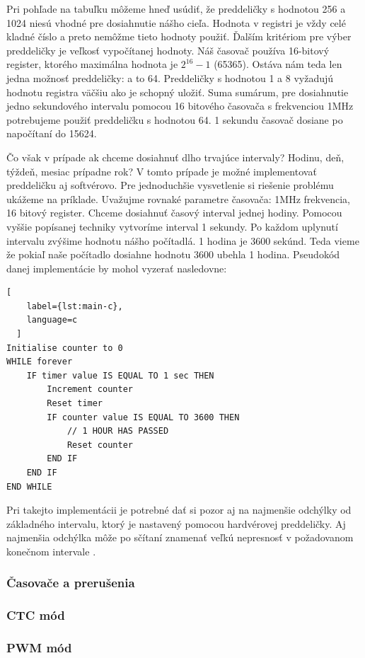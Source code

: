 Pri pohľade na tabuľku môžeme hneď usúdiť, že preddeličky s hodnotou 256 a 1024 niesú vhodné pre dosiahnutie nášho cieľa. Hodnota v registri je vždy celé kladné číslo a preto nemôžme tieto hodnoty použiť. Ďalším kritériom pre výber preddeličky je veľkosť
vypočítanej hodnoty. Náš časovač používa 16-bitový register, ktorého maximálna hodnota je $2^{16} -1$ (65365).
Ostáva nám teda len jedna možnosť preddeličky: a to 64. Preddeličky s hodnotou 1 a 8 vyžadujú hodnotu registra väčšiu ako je schopný uložiť. Suma sumárum, pre dosiahnutie jedno sekundového intervalu pomocou 16 bitového časovača s frekvenciou 1MHz potrebujeme použiť preddeličku s hodnotou 64. 1 sekundu časovač dosiane po napočítaní do 15624. \par
Čo však v prípade ak chceme dosiahnuť dlho trvajúce intervaly? Hodinu, deň, týždeň, mesiac prípadne rok?
V tomto prípade je možné implementovať preddeličku aj softvérovo. Pre jednoduchšie vysvetlenie si riešenie problému ukážeme na príklade. Uvažujme rovnaké parametre časovača: 1MHz frekvencia, 16 bitový register. Chceme dosiahnuť časový interval jednej hodiny. Pomocou vyššie popísanej techniky vytvoríme interval 1 sekundy.
Po každom uplynutí intervalu zvýšime hodnotu nášho počítadlá. 1 hodina je 3600 sekúnd. Teda vieme že pokiaľ naše počítadlo dosiahne hodnotu 3600 ubehla 1 hodina.
Pseudokód danej implementácie by mohol vyzerať nasledovne:
\begin{lstlisting}[
    label={lst:main-c},
    language=c
  ]  
Initialise counter to 0
WHILE forever
    IF timer value IS EQUAL TO 1 sec THEN
        Increment counter
        Reset timer
        IF counter value IS EQUAL TO 3600 THEN
            // 1 HOUR HAS PASSED
            Reset counter
        END IF
    END IF
END WHILE
\end{lstlisting}
Pri takejto implementácii je potrebné dať si pozor aj na najmenšie odchýlky od základného intervalu, ktorý je nastavený pomocou hardvérovej preddeličky. Aj najmenšia odchýlka môže po sčítaní znamenať veľkú nepresnosť v požadovanom konečnom intervale \cite{cameraNewbieGuideAVR2015}.

\subsubsection{Časovače a prerušenia}

\subsubsection{CTC mód}

\subsubsection{PWM mód}